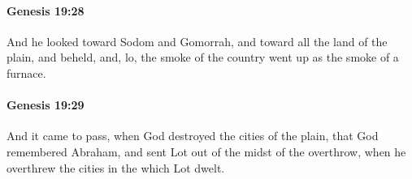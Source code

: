 		\paragraph{Genesis 19:28} %
			\label{GENESIS-19-28}

			And he looked toward Sodom and Gomorrah, and toward all the land of the plain, and beheld, and, lo, the smoke of the country went up as the smoke of a furnace.


		\paragraph{Genesis 19:29} %
			\label{GENESIS-19-29}

			And it came to pass, when God destroyed the cities of the plain, that God remembered Abraham, and sent Lot out of the midst of the overthrow, when he overthrew the cities in the which Lot dwelt.


